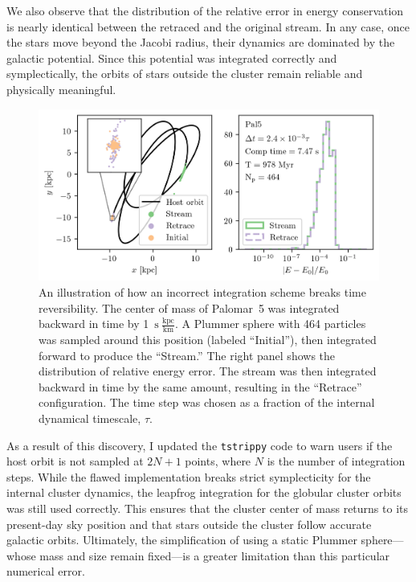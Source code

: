         We also observe that the distribution of the relative error in energy conservation is nearly identical between the retraced and the original stream. In any case, once the stars move beyond the Jacobi radius, their dynamics are dominated by the galactic potential. Since this potential was integrated correctly and symplectically, the orbits of stars outside the cluster remain reliable and physically meaningful.

        \begin{figure}
            \centering
            \includegraphics[width=\linewidth]{images/NumericalErrorStreamRetrace_Pal5_Nsteps_32768_stepsPerTau_420.png}
            \caption{An illustration of how an incorrect integration scheme breaks time reversibility. The center of mass of Palomar~5 was integrated backward in time by 1~$\mathrm{s}~\frac{\mathrm{kpc}}{\mathrm{km}}$. A Plummer sphere with 464 particles was sampled around this position (labeled “Initial”), then integrated forward to produce the “Stream.” The right panel shows the distribution of relative energy error. The stream was then integrated backward in time by the same amount, resulting in the “Retrace” configuration. The time step was chosen as a fraction of the internal dynamical timescale, $\tau$.}
            \label{fig:NumericalErrorStreamRetrace_Pal5_Nsteps_32768_stepsPerTau_420}
        \end{figure}

        As a result of this discovery, I updated the \texttt{tstrippy} code to warn users if the host orbit is not sampled at $2N + 1$ points, where $N$ is the number of integration steps. While the flawed implementation breaks strict symplecticity for the internal cluster dynamics, the leapfrog integration for the globular cluster orbits was still used correctly. This ensures that the cluster center of mass returns to its present-day sky position and that stars outside the cluster follow accurate galactic orbits. Ultimately, the simplification of using a static Plummer sphere—whose mass and size remain fixed—is a greater limitation than this particular numerical error.

